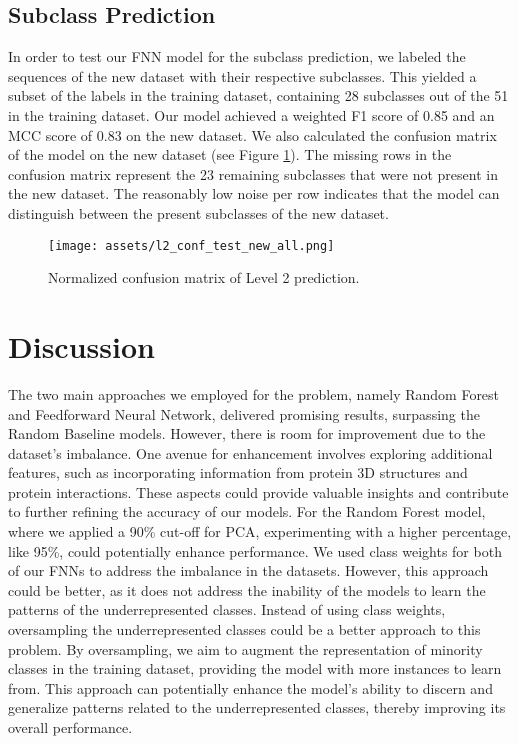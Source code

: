 \documentclass{bioinfo}
\begin{document}
\subsection{Subclass Prediction}
In order to test our FNN model for the subclass prediction, we labeled the sequences of the new dataset with their respective subclasses.
This yielded a subset of the labels in the training dataset, containing 28 subclasses out of the 51 in the training dataset.
Our model achieved a weighted F1 score of 0.85 and an MCC score of 0.83 on the new dataset. 
We also calculated the confusion matrix of the model on the new dataset (see Figure \ref{fig:FNN_conf_l2}).
The missing rows in the confusion matrix represent the 23 remaining subclasses that were not present in the new dataset.
The reasonably low noise per row indicates that the model can distinguish between the present subclasses of the new dataset.


\begin{figure}[!b]
\texttt{[image: assets/l2\_conf\_test\_new\_all.png]}
\caption{Normalized confusion matrix of Level 2 prediction.}\label{fig:FNN_conf_l2}
\end{figure}

\section{Discussion}
The two main approaches we employed for the problem, namely Random Forest and Feedforward Neural Network, delivered promising results, surpassing the Random Baseline models.
However, there is room for improvement due to the dataset's imbalance.
One avenue for enhancement involves exploring additional features, such as incorporating information from protein 3D structures and protein interactions.
These aspects could provide valuable insights and contribute to further refining the accuracy of our models.
For the Random Forest model, where we applied a 90\% cut-off for PCA, experimenting with a higher percentage, 
like 95\%, could potentially enhance performance.
We used class weights for both of our FNNs to address the imbalance in the datasets.
However, this approach could be better, as it does not address the inability of the models to learn the patterns of the underrepresented classes.
Instead of using class weights, oversampling the underrepresented classes could be a better approach to this problem.
By oversampling, we aim to augment the representation of minority classes in the training dataset, 
providing the model with more instances to learn from. 
This approach can potentially enhance the model's ability to discern and generalize patterns related to the underrepresented 
classes, thereby improving its overall performance.
\end{document}
